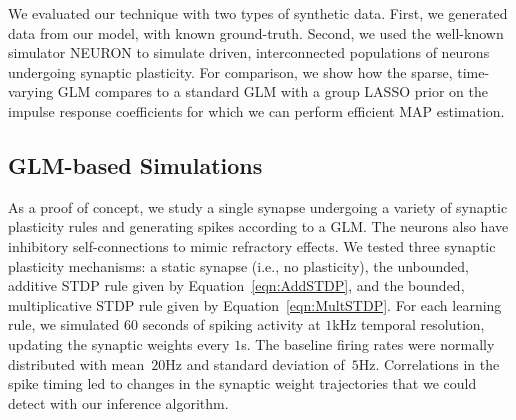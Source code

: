 We evaluated our technique with two types of synthetic data. First, we
generated data from our model, with known ground-truth. Second, we
used the well-known simulator NEURON to simulate driven,
interconnected populations of neurons undergoing synaptic
plasticity. For comparison, we show how the sparse, time-varying GLM
compares to a standard GLM with a group LASSO prior on the impulse
response coefficients for which we can perform efficient MAP
estimation.

\subsection{GLM-based Simulations}
As a proof of concept, we study a single synapse undergoing a variety
of synaptic plasticity rules and generating spikes according to a
GLM. The neurons also have inhibitory self-connections to mimic
refractory effects. We tested three synaptic plasticity mechanisms: a
static synapse (i.e., no plasticity), the unbounded, additive STDP
rule given by Equation~\ref{eqn:AddSTDP}, and the bounded,
multiplicative STDP rule given by Equation~\ref{eqn:MultSTDP}. For
each learning rule, we simulated $60$ seconds of spiking activity at
$1$kHz temporal resolution, updating the synaptic weights every $1$s. The
baseline firing rates were normally distributed with mean~$20$Hz and
standard deviation of~$5$Hz. Correlations in the spike timing led to
changes in the synaptic weight trajectories that we could detect with
our inference algorithm.

